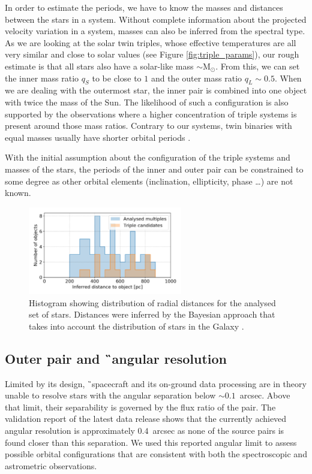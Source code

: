 In order to estimate the periods, we have to know the masses and distances between the stars in a system. Without complete information about the projected velocity variation in a system, masses can also be inferred from the spectral type. As we are looking at the solar twin triples, whose effective temperatures are all very similar and close to solar values (see Figure \ref{fig:triple_params}), our rough estimate is that all stars also have a solar-like mass $\sim$M$_{\odot}$. From this, we can set the inner mass ratio $q_S$ to be close to $1$ and the outer mass ratio $q_L \sim 0.5$. When we are dealing with the outermost star, the inner pair is combined into one object with twice the mass of the Sun. The likelihood of such a configuration is also supported by the observations \citep{2008MNRAS.389..925T} where a higher concentration of triple systems is present around those mass ratios. Contrary to our systems, twin binaries with equal masses usually have shorter orbital periods \citep{2000A&A...360..997T}. 

With the initial assumption about the configuration of the triple systems and masses of the stars, the periods of the inner and outer pair can be constrained to some degree as other orbital elements (inclination, ellipticity, phase \ldots) are not known.

\begin{figure}
	\centering
	\includegraphics[width=0.6\textwidth]{dist_pc.png}
	\caption{Histogram showing distribution of radial distances for the analysed set of stars. Distances were inferred by the Bayesian approach that takes into account the distribution of stars in the Galaxy \citep{2018AJ....156...58B}.}
	\label{fig:gaia_dist}
\end{figure}

\subsection{Outer pair and \G\ angular resolution}
\label{sec:orbits_gaia}
Limited by its design, \G\ spacecraft and its on-ground data processing are in theory unable to resolve stars with the angular separation below $\sim0.1$~arcsec. Above that limit, their separability is governed by the flux ratio of the pair. The validation report of the latest data release \citep{2018A&A...616A..17A} shows that the currently achieved angular resolution is approximately $0.4$~arcsec as none of the source pairs is found closer than this separation. We used this reported angular limit to assess possible orbital configurations that are consistent with both the spectroscopic and astrometric observations.

